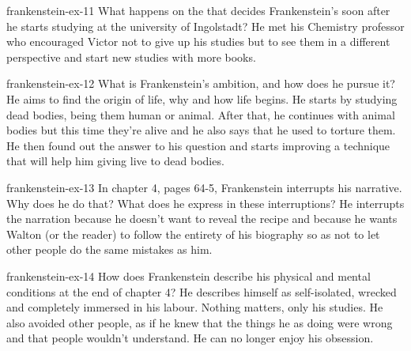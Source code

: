 \documentclass[preview]{standalone}
\begin{document}
\begin{snippetexercise}{frankenstein-ex-11}
    {What happens on the  that decides Frankenstein's 
    soon after he starts studying at the university of Ingolstadt?}
    He met his Chemistry professor who encouraged Victor not to give up his studies
    but to see them in a different perspective and start new studies
    with more books.
\end{snippetexercise}

\begin{snippetexercise}{frankenstein-ex-12}
    {What is Frankenstein's ambition, and how does he pursue it?}
    He aims to find the origin of life, why and how life begins.
    He starts by studying dead bodies, being them human or animal.
    After that, he continues with animal bodies but this time they're alive and he also says that he
    used to torture them.
    He then found out the answer to his question and starts improving a technique that will help
    him giving live to dead bodies.
\end{snippetexercise}

\begin{snippetexercise}{frankenstein-ex-13}
    {In chapter 4, pages 64-5, Frankenstein interrupts his narrative. Why does he do that? What does
    he express in these interruptions?}
    He interrupts the narration because he doesn't want to reveal the recipe
    and because he wants Walton (or the reader) to follow the entirety
    of his biography so as not to let other people do the same mistakes as him.
\end{snippetexercise}

\begin{snippetexercise}{frankenstein-ex-14}
    {How does Frankenstein describe his physical and mental conditions at the end of chapter 4?}
    He describes himself as self-isolated, wrecked and completely immersed
    in his labour. Nothing matters, only his studies. He also
    avoided other people, as if he knew that the things he as doing
    were wrong and that people wouldn't understand.
    He can no longer enjoy his obsession.
\end{snippetexercise}
\end{document}
